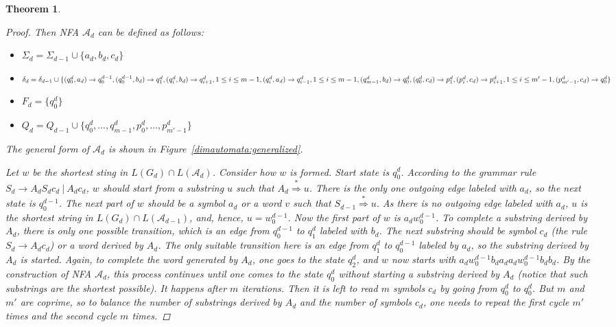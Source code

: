 \documentclass[11pt,a4paper]{article} %
\newtheorem{theorem}{Theorem}
\begin{document}
\begin{theorem}
\begin{proof}
Then NFA $\mathcal{A}_{d}$ can be defined as follows:
\begin{itemize}
\item $\Sigma_{d} = \Sigma_{d-1} \cup \{a_d, b_d, c_d\}$
\item $\delta_{d} = \delta_{d-1} \cup \{
\\(q^{d}_{0}, a_d) \rightarrow q^{d-1}_{0},
\\(q^{d-1}_{0}, b_d) \rightarrow q^{d}_{1},
\\(q^{d}_{i}, b_d) \rightarrow q^{d}_{i+1}, 1 \le i \le m-1,
\\(q^{d}_{i}, a_d) \rightarrow q^{d}_{i-1}, 1 \le i \le m-1,
\\(q^{d}_{m-1}, b_d) \rightarrow q^{d}_{0},
\\(q^{d}_{0}, c_d) \rightarrow p^{d}_{1},
\\(p^{d}_{i}, c_d) \rightarrow p^{d}_{i+1}, 1 \le i \le m'-1,
\\(p^{d}_{m'-1}, c_d) \rightarrow q^{d}_{0}\}$
\item $F_d = \{q^{d}_{0}\}$
\item $Q_d = Q_{d-1} \cup \{ q^d_{0}, ..., q^d_{m-1}, p^d_{0}, ..., p^d_{m'-1}\}$
\end{itemize}
The general form of $\mathcal{A}_{d}$ is shown in Figure~\ref{dimautomata:generalized}.

Let $w$ be the shortest sting in $L(G_d) \cap L(\mathcal{A}_{d})$. Consider how $w$ is formed. Start state is $q^{d}_{0}$. According to the grammar rule $S_d \rightarrow A_d S_d c_d\ \vert \ A_d c_d $, $w$ should start from a substring $u$ such that $A_d  \stackrel {*}{\Rightarrow } u$. There is the only one outgoing edge labeled with $a_d$, so the next state is $q^{d-1}_{0}$. The next part of $w$ should be a symbol $a_d$  or a word $v$ such that $S_{d-1}  \stackrel {*}{\Rightarrow } u$. As there is no outgoing edge labeled with $a_d$, $u$ is the shortest string in $L(G_d) \cap L(\mathcal{A}_{d-1})$, and, hence, $u = w_0^{d-1}$. Now the first part of $w$ is $a_d w_0^{d-1}$. To complete a substring derived by $A_d$, there is only one possible transition, which is an edge from $q^{d-1}_{0}$ to $q^d_1$ labeled with $b_d$. The next substring should be symbol $c_d$ (the rule $S_d \rightarrow A_d c_d$) or a word derived by $A_d$. The only suitable transition here is an edge from $q^d_1$ to $q^{d-1}_{0}$ labeled by $a_d$, so the substring derived by $A_d$ is started. Again, to complete the word generated by $A_d$, one goes to the state $q^d_2$, and $w$ now starts with $a_d w_0^{d-1} b_d a_d a_d w_0^{d-1} b_d b_d$. By the construction of NFA $\mathcal{A}_{d}$, this process continues until one comes to the state $q^d_{0}$ without starting a substring derived by $A_d$ (notice that such substrings are the shortest possible). It happens after $m$ iterations. Then it is left to read $m$ symbols $c_d$ by going from $q^d_{0}$ to $q^d_{0}$. But $m$ and $m'$ are coprime, so to balance the number of substrings derived by $A_d$ and the number of symbols $c_d$, one needs to repeat the first cycle $m'$ times and the second cycle $m$ times.


\end{proof}
\end{theorem}
\end{document}
